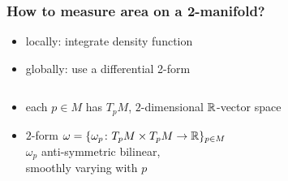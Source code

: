 \begin{frame}
  \frametitle{How to measure area on a 2-manifold?}
  \begin{itemize}
  \item locally: integrate density function
  \item globally: use a differential 2-form
  \end{itemize}
  \begin{columns}
    \begin{column}{0.7\textwidth}
      \begin{itemize}
        \item each $p\in M$ has  $T_pM$, $2$-dimensional $\mathbb{R}$-vector space
        \item $2$-form $\omega = \{\omega_p\colon T_pM\times T_pM\to \mathbb{R}\}_{p\in M}$\\ $\omega_p$ anti-symmetric bilinear,\\ smoothly varying with $p$
      \end{itemize}
    \end{column}
    \begin{column}{0.21\textwidth}
      \vspace{3mm}\hspace{-8mm}

\end{column}
\end{columns}
\end{frame}
